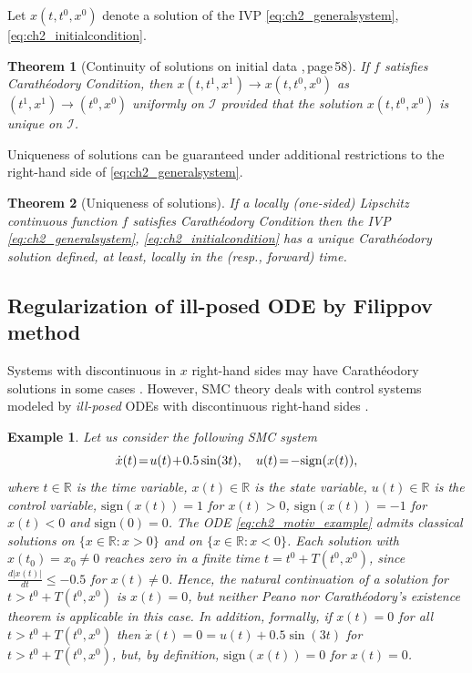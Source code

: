 \documentclass{article}
\newcommand{\R}{\mathbb{R}}
\newcommand{\sign}{\mathrm{sign}}
\newtheorem{theorem}{Theorem}
\newtheorem{example}{Example}
\begin{document}
Let $x(t,t^0,x^0)$ denote  a solution of the IVP  \eqref{eq:ch2_generalsystem}, \eqref{eq:ch2_initialcondition}. 

\begin{theorem}[\small Continuity of solutions on initial data {\cite{CoddingtonLevinson1955:Book},\,page\,58}]\label{thm:con_sol_strong_Rn}
\itshape If $f$ satisfies Carath\'{e}odory Condition, then $x(t,t^1,x^1)\to x(t,t^0,x^0)$ as $(t^1,x^1)\to (t^0,x^0)$ uniformly on $\mathcal{I}$ provided that
the
solution $x(t,t^0,x^0)$
 is  unique on $\mathcal{I}$.
\end{theorem}

Uniqueness of solutions can be guaranteed under additional restrictions to the right-hand side of \eqref{eq:ch2_generalsystem}. 
\begin{theorem}[Uniqueness of solutions]	\itshape \label{thm:uniqness_ODE}
If  a locally {(one-sided)} Lipschitz continuous function $f$ satisfies   Carath\'{e}odory  Condition
then the IVP \eqref{eq:ch2_generalsystem}, \eqref{eq:ch2_initialcondition} has a unique  Carath\'{e}odory solution defined, at least, locally in the (resp., forward) time.
\end{theorem}
\vspace{-1mm}
\subsection{Regularization of ill-posed ODE by Filippov method}

Systems with discontinuous in $x$ right-hand sides may have Carath\'{e}odory solutions in some cases \cite{Liberzon2003:Book}.
However, SMC theory deals with control systems modeled by \textit{ill-posed} ODEs with discontinuous right-hand sides \cite{Utkin_etal2009:Book, Liberzon2003:Book, GeligLeonovYakubovich2004:Book}. 
\begin{example}\itshape Let us consider the following SMC system\vspace{-1mm}
\begin{equation}\label{eq:ch2_motiv_example}
	\dot x(t)\!=\!u(t)\!+\!0.5\sin(3t),  \quad u(t)\!=\!-\sign(x(t)),  \vspace{-1mm}
\end{equation}
where $t\in \R$ is the time variable, $x(t)\in \R$ is the state variable, $u(t)\in \R$ is the control variable,  
$\sign(x(t))=1$ for $x(t)>0$, $\sign(x(t))=-1$ for $x(t)<0$ and $\sign(0)=0$. The ODE \eqref{eq:ch2_motiv_example} admits classical solutions on $\{x\!\in\! \R: x\!>\!0\}$ and on $\{x\!\in\! \R : x\!<\!0\}$. Each solution with $x(t_0)\!=\!x_0\!\neq\! 0$ reaches zero  in a finite time $t=t^0+T(t^0,x^0)$, since $\frac{d|x(t)|}{dt}
\leq-0.5$ for $x(t)\neq 0$. Hence, the natural continuation of a solution for $t>t^0+T(t^0,x^0)$ is $x(t)=0$, but neither Peano nor Carath\'{e}odory's existence theorem is applicable in this case. 
In addition, formally, if $x(t)=0$ for all $t>t^0+T(t^0,x^0)$ then $\dot x(t)=0=u(t)+0.5\sin(3t)$ for $t>t^0+T(t^0,x^0)$, but, by definition, $\sign(x(t))=0$ for $x(t)=0$.
\end{example}
\end{document}
